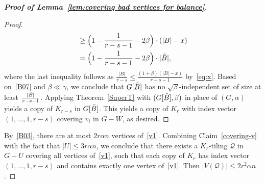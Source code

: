 \documentclass[11pt, a4paper]{article}
\theoremstyle{definition}
\newcommand{\<}{\subseteq}
\begin{document}
\begin{proof}[{\bf Proof of Lemma~\ref{lem:covering bad vertices for balance}}]
\begin{proof}
\begin{align*}
&\geq\Big(1-\frac{1}{r-s-1}-2\beta\Big)\cdot(|B|-x)\\
&=\Big(1-\frac{1}{r-s-1}-2\beta\Big)\cdot|\Tilde{B}|,
\end{align*}
where the last inequality follows as %
$\frac{|B|}{r-s}\le\frac{(1+{\beta})(|B|-x)}{r-s-1}$ by~\eqref{eq:x}.
Based on~\ref{B07} and $\beta\ll \gamma$, we conclude that $G[\Tilde{B}]$ has no $\sqrt{\beta}$-independent set of size at least $\frac{|\Tilde{B}|}{r-s-1}$.  Applying Theorem~\ref{SuperT} with $(G[\Tilde{B}],\beta)$ in place of $(G,\alpha)$ yields a copy of $K_{r-s}$ in $G[\Tilde{B}]$. {This yields a copy of \(K_r\) with index vector $(1,\ldots,1,r-s)$ covering \(v_i\) in \(G-W\), as desired.} %
\end{proof}

By~\ref{B03}, there are at most $2r\alpha n$ vertices of~\ref{v1}. 
Combining Claim~\ref{covering-v} with the fact that $|U|\leq 3r\alpha n$, {we conclude that} there exists a \(K_r\)-tiling \(\mathcal{Q}\) in \(G-U\) covering all vertices of~\ref{v1}, such that each copy of \(K_r\) has index vector \((1,\dots,1,r-s)\) and contains exactly one vertex of~\ref{v1}.  
Then $|V(\mathcal{Q})|\le2r^2\alpha n$.




\end{proof}
\end{document}
